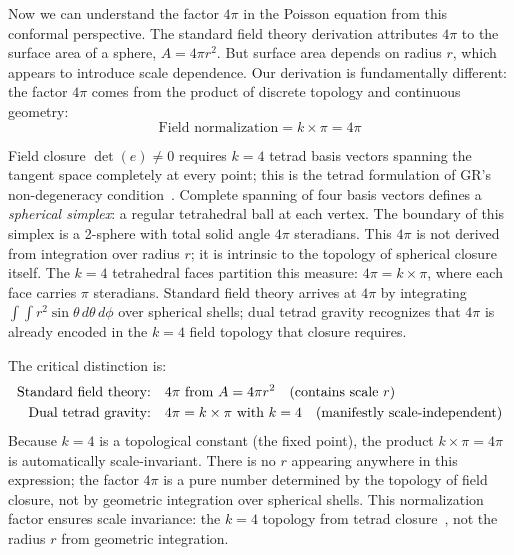 Now we can understand the factor $4\pi$ in the Poisson equation from this conformal perspective. The standard field theory derivation attributes $4\pi$ to the surface area of a sphere, $A = 4\pi r^2$. But surface area depends on radius $r$, which appears to introduce scale dependence. Our derivation is fundamentally different: the factor $4\pi$ comes from the product of discrete topology and continuous geometry:
\begin{equation}
\text{Field normalization} = k \times \pi = 4\pi
\label{eq:field-normalization}
\end{equation}

Field closure $\det(e) \neq 0$ requires $k=4$ tetrad basis vectors spanning the tangent space completely at every point; this is the tetrad formulation of GR's non-degeneracy condition~\cite{mtw1973,wald1984}. Complete spanning of four basis vectors defines a \emph{spherical simplex}: a regular tetrahedral ball at each vertex. The boundary of this simplex is a 2-sphere with total solid angle $4\pi$ steradians. This $4\pi$ is not derived from integration over radius $r$; it is intrinsic to the topology of spherical closure itself. The $k=4$ tetrahedral faces partition this measure: $4\pi = k \times \pi$, where each face carries $\pi$ steradians. Standard field theory arrives at $4\pi$ by integrating $\int\int r^2 \sin\theta\,d\theta\,d\phi$ over spherical shells; dual tetrad gravity recognizes that $4\pi$ is already encoded in the $k=4$ field topology that closure requires.

The critical distinction is:
\begin{align}
\text{Standard field theory:} \quad & 4\pi \text{ from } A = 4\pi r^2 \quad \text{(contains scale } r\text{)} \notag \\
\text{Dual tetrad gravity:} \quad & 4\pi = k \times \pi \text{ with } k=4 \quad \text{(manifestly scale-independent)}
\label{eq:4pi-distinction}
\end{align}
Because $k=4$ is a topological constant (the fixed point), the product $k\times\pi = 4\pi$ is automatically scale-invariant. There is no $r$ appearing anywhere in this expression; the factor $4\pi$ is a pure number determined by the topology of field closure, not by geometric integration over spherical shells. This normalization factor ensures scale invariance: the $k=4$ topology from tetrad closure~\cite{mtw1973,wald1984}, not the radius $r$ from geometric integration.

